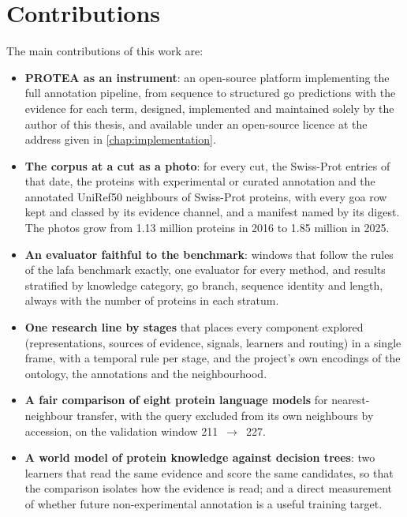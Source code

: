 \section{Contributions}
\label{sec:contributions}

The main contributions of this work are:

\begin{itemize}
  \item \textbf{PROTEA as an instrument}: an open-source platform implementing the full
        annotation pipeline, from sequence to structured \gls{go} predictions with the
        evidence for each term, designed, implemented and maintained solely by the
        author of this thesis, and available under an open-source licence at the
        address given in \cref{chap:implementation}.

  \item \textbf{The corpus at a cut as a photo}: for every cut, the Swiss-Prot entries
        of that date, the proteins with experimental or curated annotation and the
        annotated UniRef50 neighbours of Swiss-Prot proteins, with every \gls{goa} row
        kept and classed by its evidence channel, and a manifest named by its digest.
        The photos grow from 1.13 million proteins in 2016 to 1.85 million in 2025.

  \item \textbf{An evaluator faithful to the benchmark}: windows that follow the rules
        of the \gls{lafa} benchmark exactly, one evaluator for every method, and
        results stratified by knowledge category, \gls{go} branch, sequence identity
        and length, always with the number of proteins in each stratum.

  \item \textbf{One research line by stages} that places every component explored
        (representations, sources of evidence, signals, learners and routing) in a
        single frame, with a temporal rule per stage, and the project's own encodings
        of the ontology, the annotations and the neighbourhood.

  \item \textbf{A fair comparison of eight protein language models} for
        nearest-neighbour transfer, with the query excluded from its own neighbours by
        accession, on the validation window 211~$\to$~227.

  \item \textbf{A world model of protein knowledge against decision trees}: two
        learners that read the same evidence and score the same candidates, so that the
        comparison isolates how the evidence is read; and a direct measurement of
        whether future non-experimental annotation is a useful training target.


\end{itemize}

